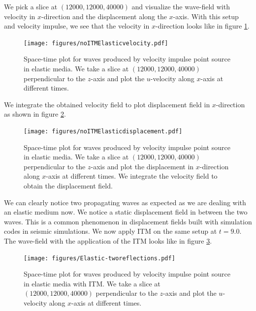 We pick a slice at $\left(12000,12000,40000\right)$ and visualize the wave-field with velocity in $x$-direction and the displacement along the $x$-axis. With this setup and velocity impulse, 
we see that the velocity in $x$-direction looks like in figure \ref{fig:space-timeplot-elasticnoITM}.

\begin{figure}[htpb]
    \centering
    \texttt{[image: figures/noITMElasticvelocity.pdf]}
    \caption{Space-time plot for waves produced by velocity impulse point source in elastic media. We take a slice at $\left(12000,12000,40000\right)$ perpendicular to the $z$-axis
    and plot the $u$-velocity along $x$-axis at different times.}
    \label{fig:space-timeplot-elasticnoITM}
\end{figure}

We integrate the obtained velocity field to plot displacement field in $x$-direction as shown in figure \ref{fig:space-timeplot-elasticnoITMdisplacement}.

\begin{figure}[htpb]
    \centering
    \texttt{[image: figures/noITMElasticdisplacement.pdf]}
    \caption{Space-time plot for waves produced by velocity impulse point source in elastic media. We take a slice at $\left(12000,12000,40000\right)$ perpendicular to the $z$-axis
    and plot the displacement in $x$-direction along $x$-axis at different times. We integrate the velocity field to obtain the displacement field.}
    \label{fig:space-timeplot-elasticnoITMdisplacement}
\end{figure}

We can clearly notice two propagating waves as expected as we are dealing with an elastic medium now. We notice a static displacement field in between the two waves.
This is a common phenomenon in displacement fields built with simulation codes in seismic simulations. 
We now apply \ac{ITM} on the same setup at $t=9.0$. The wave-field with the application of the \ac{ITM} looks like in figure \ref{fig:space-timeplot-elasticITM}.

\begin{figure}[htpb]
    \centering
    \texttt{[image: figures/Elastic-tworeflections.pdf]}
    \caption{Space-time plot for waves produced by velocity impulse point source in elastic media with \ac{ITM}. We take a slice at $\left(12000,12000,40000\right)$ perpendicular to the $z$-axis
    and plot the $u$-velocity along $x$-axis at different times.}
    \label{fig:space-timeplot-elasticITM}
\end{figure}

